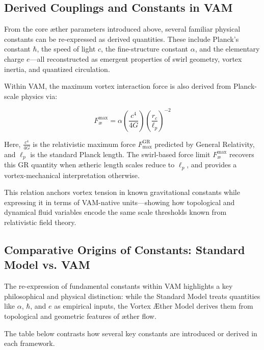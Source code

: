 \subsection*{Derived Couplings and Constants in VAM}

From the core æther parameters introduced above, several familiar physical constants can be re-expressed as derived quantities. These include Planck’s constant $\hbar$, the speed of light $c$, the fine-structure constant $\alpha$, and the elementary charge $e$—all reconstructed as emergent properties of swirl geometry, vortex inertia, and quantized circulation.

Within VAM, the maximum vortex interaction force is also derived from Planck-scale physics via:

\begin{equation}
    F^{\text{max}}_{\text{\ae}} = \alpha \left(\frac{c^4}{4G}\right)  \left(\frac{r_c}{\ell_p}\right)^{-2}
    \label{eq:FmaxVAMfromGR}
\end{equation}

Here, $\frac{c^4}{4G}$ is the relativistic maximum force $F^{\text{GR}}_\text{max}$ predicted by General Relativity, and $\ell_p$ is the standard Planck length. The swirl-based force limit $F^{\text{max}}_{\text{\ae}}$ recovers this GR quantity when ætheric length scales reduce to $\ell_p$, and provides a vortex-mechanical interpretation otherwise.

This relation anchors vortex tension in known gravitational constants while expressing it in terms of VAM-native units—showing how topological and dynamical fluid variables encode the same scale thresholds known from relativistic field theory.


\subsection*{Comparative Origins of Constants: Standard Model vs. VAM}

The re-expression of fundamental constants within VAM highlights a key philosophical and physical distinction: while the Standard Model treats quantities like $\alpha$, $\hbar$, and $e$ as empirical inputs, the Vortex Æther Model derives them from topological and geometric features of æther flow.

The table below contrasts how several key constants are introduced or derived in each framework.

